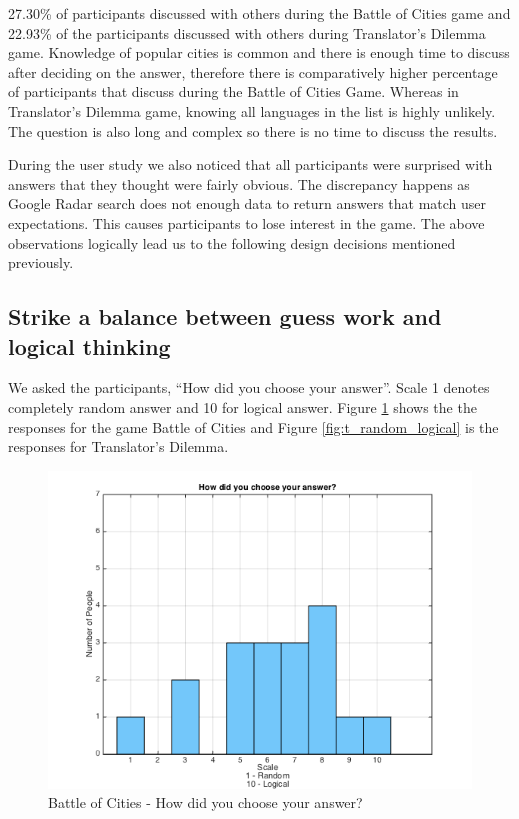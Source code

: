 \documentclass{sig-alternate}
\begin{document}
27.30\% of participants discussed with others during the Battle of Cities game and 22.93\% of the participants discussed with others during Translator's Dilemma game. Knowledge of popular 
cities is common and there is enough time to discuss after deciding on the answer, therefore 
there is comparatively higher percentage of participants that discuss during the Battle of Cities Game. Whereas 
in Translator's Dilemma game, knowing all languages in the list is highly unlikely. 
The question is also long and complex so there is no time to discuss the results. 

During the user study we also noticed that all participants were surprised with answers that they thought were fairly obvious. The discrepancy happens as Google Radar search does not enough data to return answers that match user expectations. This causes participants to lose interest in the game. The above observations logically lead us to the following design decisions mentioned previously.

\subsection{Strike a balance between guess work and logical thinking}
We asked the participants, ``How did you choose your answer''. Scale 1 denotes completely random answer and 10 for logical answer. Figure \ref{fig:p_random_logical} shows the the responses for the game Battle of Cities and Figure \ref{fig:t_random_logical} is the responses for Translator's Dilemma. 

\begin{figure}
	\includegraphics[width=\linewidth]{p_random_logical.png}
	\caption{Battle of Cities - How did you choose your answer?}
	\label{fig:p_random_logical}
\end{figure}
\end{document}
